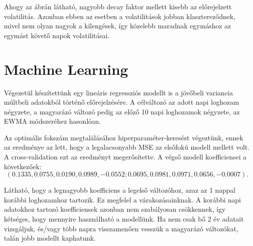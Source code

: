 \documentclass[12pt]{article}
\begin{document}
Ahogy az ábrán látható, nagyobb decay faktor mellett kisebb az előrejelzett volatilitás. Azonban ebben az esetben a volatilitások jobban klasztereződnek, mivel nem olyan nagyok a kilengések, így közelebb maradnak egymáshoz az egymást követő napok volatilitásai.


\section{Machine Learning}

Végezetül készítettünk egy lineáris regressziós modellt is a jövőbeli variancia múltbeli adatokból történő előrejelzésére. A célváltozó az adott napi loghozam négyzete, a magyarázó változó pedig az előző 10 napi loghozamok négyzete, az EWMA módszeréhez hasonlóan. 

Az optimális fokszám megtalálásához hiperparaméter-keresést végeztünk, ennek az eredménye az lett, hogy a legalacsonyabb MSE az elsőfokú modell mellett volt. A cross-validation ezt az eredményt megerősítette. A végső modell koefficiensei a következőek: 
$$(0.1335, 0.0755, 0.0190, 0.0989, -0.0552; 0.0695, 0.0981, 0.0971, 0.0656, -0.0007).$$

Látható, hogy a legnagyobb koefficiens a legelső változóhoz, azaz az 1 nappal korábbi loghozamhoz tartozik. Ez megfelel a várakozásainknak. A korábbi napi adatokhoz tartozó koefficiensek azonban nem szabályosan csökkennek, így kétséges, hogy mennyire használható a modellünk. Ha nem csak bő 2 év adatait vizsgáljuk, és/vagy több napra visszamenően vesszük a magyarázó változókat, talán jobb modellt kaphatunk.
\end{document}

